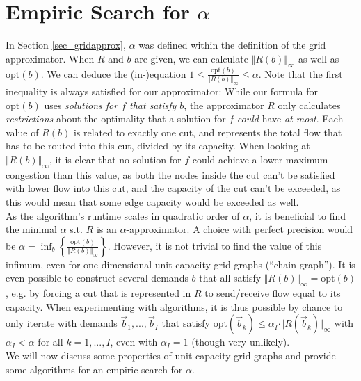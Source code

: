 \section{Empiric Search for $\alpha$}
\label{sec_esalpha}
In Section \ref{sec_gridapprox}, $\alpha$ was defined within the definition of the grid approximator. When $R$ and $b$ are given, we can calculate $\Vert R(b)\Vert_\infty$ as well as $\text{opt}(b)$. We can deduce the (in-)equation $1\leq \frac{\text{opt}(b)}{\Vert R(b)\Vert_\infty}\leq \alpha$. Note that the first inequality is always satisfied for our approximator: While our formula for $\text{opt}(b)$ uses \textit{solutions for $f$ that satisfy $b$}, the approximator $R$ only calculates \textit{restrictions} about the optimality that a solution for $f$ \textit{could} have \textit{at most}. Each value of $R(b)$ is related to exactly one cut, and represents the total flow that has to be routed into this cut, divided by its capacity. When looking at $\Vert R(b)\Vert_\infty$, it is clear that no solution for $f$ could achieve a lower maximum congestion than this value, as both the nodes inside the cut can't be satisfied with lower flow into this cut, and the capacity of the cut can't be exceeded, as this would mean that some edge capacity would be exceeded as well.\\
As the algorithm's runtime scales in quadratic order of $\alpha$, it is beneficial to find the minimal $\alpha$ s.t. $R$ is an $\alpha$-approximator. A choice with perfect precision would be $\alpha=\inf_b\left\{\frac{\text{opt}(b)}{\Vert R(b)\Vert_\infty}\right\}$. However, it is not trivial to find the value of this infimum, even for one-dimensional unit-capacity grid graphs (``chain graph''). It is even possible to construct several demands $b$ that all satisfy $\Vert R(b)\Vert_\infty=\text{opt}(b)$, e.g. by forcing a cut that is represented in $R$ to send/receive flow equal to its capacity. When experimenting with algorithms, it is thus possible by chance to only iterate with demands $\vec{b}_1,...,\vec{b}_I$ that satisfy $\text{opt}(\vec{b}_k)\leq \alpha_I\cdot \Vert R(\vec{b}_k)\Vert_\infty$ with $\alpha_I< \alpha$ for all $k=1,...,I$, even with $\alpha_I=1$ (though very unlikely). \\
We will now discuss some properties of unit-capacity grid graphs and provide some algorithms for an empiric search for $\alpha$.
